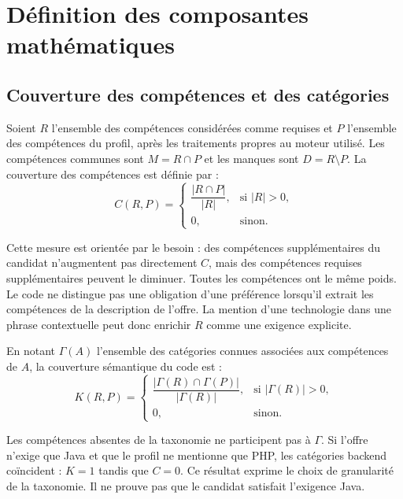 \section{Définition des composantes mathématiques}

\subsection{Couverture des compétences et des catégories}

Soient $R$ l'ensemble des compétences considérées comme requises et $P$ l'ensemble des compétences du profil, après les traitements propres au moteur utilisé. Les compétences communes sont $M=R\cap P$ et les manques sont $D=R\setminus P$. La couverture des compétences est définie par :
\begin{equation}
C(R,P)=
\begin{cases}
\dfrac{|R\cap P|}{|R|}, & \text{si } |R|>0,\\[4pt]
0, & \text{sinon}.
\end{cases}
\label{eq:couverture-competences}
\end{equation}

Cette mesure est orientée par le besoin : des compétences supplémentaires du candidat n'augmentent pas directement $C$, mais des compétences requises supplémentaires peuvent le diminuer. Toutes les compétences ont le même poids. Le code ne distingue pas une obligation d'une préférence lorsqu'il extrait les compétences de la description de l'offre. La mention d'une technologie dans une phrase contextuelle peut donc enrichir $R$ comme une exigence explicite.

En notant $\Gamma(A)$ l'ensemble des catégories connues associées aux compétences de $A$, la couverture sémantique du code est :
\begin{equation}
K(R,P)=
\begin{cases}
\dfrac{|\Gamma(R)\cap\Gamma(P)|}{|\Gamma(R)|}, & \text{si } |\Gamma(R)|>0,\\[4pt]
0, & \text{sinon}.
\end{cases}
\label{eq:couverture-categories}
\end{equation}

Les compétences absentes de la taxonomie ne participent pas à $\Gamma$. Si l'offre n'exige que Java et que le profil ne mentionne que PHP, les catégories backend coïncident : $K=1$ tandis que $C=0$. Ce résultat exprime le choix de granularité de la taxonomie. Il ne prouve pas que le candidat satisfait l'exigence Java.

